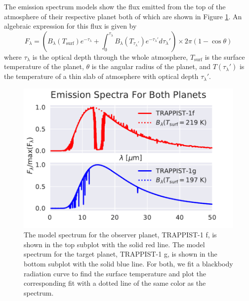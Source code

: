 \documentclass{knac}
\begin{document}
The emission spectrum models show the flux emitted from the top of the atmosphere of their respective planet both of which are shown in Figure \ref{figure:emission_spectra}. An algebraic expression for this flux is given by
\begin{equation}
F_\lambda = \left(B_{\lambda}(T_\mathrm{surf})e^{-\tau_\lambda} + \int_{0}^{\tau_\lambda} B_\lambda (T_{\tau_{\lambda}'})e^{-\tau_{\lambda}'}d\tau_{\lambda}' \right)\times 2\pi\left(1 - \cos{\theta}\right)
\label{equation:f_lambda}
\end{equation} where $\tau_\lambda$ is the optical depth through the whole atmosphere, $T_\mathrm{surf}$ is the surface temperature of the planet, $\theta$ is the angular radius of the planet, and $T(\tau_{\lambda}')$ is the temperature of a thin slab of atmosphere with optical depth $\tau_{\lambda}'$.


\begin{figure}[bht]
\centering
\includegraphics[angle=0,scale=0.82]{emission_both.pdf}
\caption{The model spectrum for the observer planet, TRAPPIST-1 f, is shown in the top subplot with the solid red line. The model spectrum for the target planet, TRAPPIST-1 g, is shown in the bottom subplot with the solid blue line. For both, we fit a blackbody radiation curve to find the surface temperature and plot the corresponding fit with a dotted line of the same color as the spectrum.}
\label{figure:emission_spectra}
\end{figure}
\end{document}

